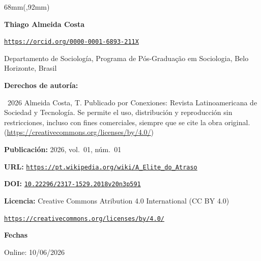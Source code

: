 \documentclass{article}
\newlength{\gbbloquex}
\begin{document}
\begin{textblock*}{68mm}(\gbbloquex,92mm)
{\setlength{\leftskip}{0pt}\setlength{\parindent}{0pt}%
\noindent\begin{minipage}[t]{68mm}
\sffamily\small\setlength{\parskip}{1pt}
{\bfseries\color{azulrevista}Thiago Almeida Costa}\par
{\scriptsize\texttt{\href{https://orcid.org/0000-0001-6893-211X}{https://orcid.org/0000-0001-6893-211X}}}\par
Departamento de Sociología, Programa de Pós-Graduação em Sociologia, Belo Horizonte, Brasil\par
\vspace{6pt}
{\bfseries\color{azulrevista!70}Derechos de autor\'ia:}\par
\textcopyright\ 2026 Almeida Costa, T. Publicado por Conexiones: Revista Latinoamericana de Sociedad y Tecnología. Se permite el uso, distribución y reproducción sin restricciones, incluso con fines comerciales, siempre que se cite la obra original. (\href{https://creativecommons.org/licenses/by/4.0/}{https://creativecommons.org/licenses/by/4.0/})\par\vspace{6pt}
{\bfseries\color{azulrevista!70}Publicación:} 2026, vol.~01, n\'um.~01\par\vspace{6pt}
{\bfseries\color{azulrevista!70}URL:} {\scriptsize\texttt{\href{https://pt.wikipedia.org/wiki/A_Elite_do_Atraso}{https://pt.wikipedia.org/wiki/A_Elite_do_Atraso}}}\par\vspace{6pt}
{\bfseries\color{azulrevista!70}DOI:} {\scriptsize\texttt{\href{https://doi.org/10.22296/2317-1529.2018v20n3p591}{10.22296/2317-1529.2018v20n3p591}}}\par\vspace{6pt}
{\bfseries\color{azulrevista!70}Licencia:} Creative Commons Atribution 4.0 International (CC BY 4.0)\par
{\scriptsize\texttt{\href{https://creativecommons.org/licenses/by/4.0/}{https://creativecommons.org/licenses/by/4.0/}}}\par
\vspace{6pt}
{\bfseries\color{azulrevista!70}Fechas}\par\vspace{2pt}
Online: 10/06/2026\par
\vspace{6pt}
\vspace{6pt}

\end{minipage}}
\end{textblock*}
\end{document}
